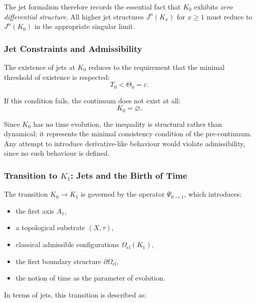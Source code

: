 The jet formalism therefore records the essential fact that $K_0$
exhibits \emph{zero differential structure}. All higher jet structures
$J^n(K_x)$ for $x\ge1$ must reduce to $J^n(K_0)$ in the appropriate
singular limit.



\subsubsection{Jet Constraints and Admissibility}

The existence of jets at $K_0$ reduces to the requirement that the minimal
threshold of existence is respected:
\[
T_0 < \Theta_0 = \varepsilon.
\]

If this condition fails, the continuum does not exist at all:
\[
K_0 = \varnothing.
\]

Since $K_0$ has no time evolution, the inequality is structural rather
than dynamical; it represents the minimal consistency condition of the
pre-continuum. Any attempt to introduce derivative-like behaviour would
violate admissibility, since no such behaviour is defined.



\subsubsection{Transition to \texorpdfstring{\texorpdfstring{$K_1$}{K_1}}{K1}: Jets and the Birth of Time}

The transition $K_0 \to K_1$ is governed by the operator $\Psi_{0\to1}$,
which introduces:

\begin{itemize}
    \item the first axis $A_1$,
    \item a topological substrate $(X,\tau)$,
    \item classical admissible configurations $\Omega_{\mathrm{cl}}(K_1)$,
    \item the first boundary structure $\partial\Omega_{\mathrm{cl}}$,
    \item the notion of time as the parameter of evolution.
\end{itemize}

In terms of jets, this transition is described as:

